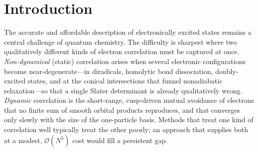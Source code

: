 \documentclass[aps,prb,reprint,superscriptaddress,floatfix]{revtex4-2}
\newcommand{\Hbar}{\bar{H}}
\begin{document}
\begin{abstract}
correlator generates) is normal-ordered against the reference density and
density-fitted. The transcorrelated response matrix is non-Hermitian, requiring a general
(non-symmetric) reduced-space eigensolver that reduces to the standard symmetric
solver in the $\tau=0$ limit. As a proof of concept for the transcorrelated
\emph{operator}, a self-contained, package-free implementation shows for 
that full configuration interaction with $\Hbar$ (TC-FCI) drives the finite-basis
energy down toward the exact Kolos--Wolniewicz limit---recovering basis-set
incompleteness that the same wavefunction misses under the bare Hamiltonian---while
the bare HF, MP2, and FCI energies reproduce an independent \textsc{PySCF}
calculation to all printed digits and the transcorrelated integrals are certified to
$\sim\!10^{-12}$ against analytic and operator-identity targets. Building $\Hbar$
into the MRSF excited-state response (the non-Hermitian eigensolver plus
transcorrelated effective integrals) is in progress and is not benchmarked here. We argue that
TC--MRSF-CIS occupies a distinctive niche relative to ADC(2): equal
$\mathcal{O}(N^5)$ scaling and comparable dynamic correlation, but with the
non-dynamical correlation and correct conical-intersection topology that
single-reference perturbation theories lack.
\end{abstract}

\maketitle

\section{Introduction}

The accurate and affordable description of electronically excited states remains
a central challenge of quantum chemistry. The difficulty is sharpest where two
qualitatively different kinds of electron correlation must be captured at once.
\emph{Non-dynamical} (static) correlation arises when several electronic
configurations become near-degenerate---in diradicals, homolytic bond
dissociation, doubly-excited states, and at the conical intersections that funnel
nonadiabatic relaxation---so that a single Slater determinant is already
qualitatively wrong. \emph{Dynamic} correlation is the short-range, cusp-driven
mutual avoidance of electrons that no finite sum of smooth orbital products
reproduces, and that converges only slowly with the size of the one-particle
basis. Methods that treat one kind of correlation well typically treat the other
poorly; an approach that supplies both at a modest, $\mathcal{O}(N^5)$ cost would
fill a persistent gap.
\end{document}
